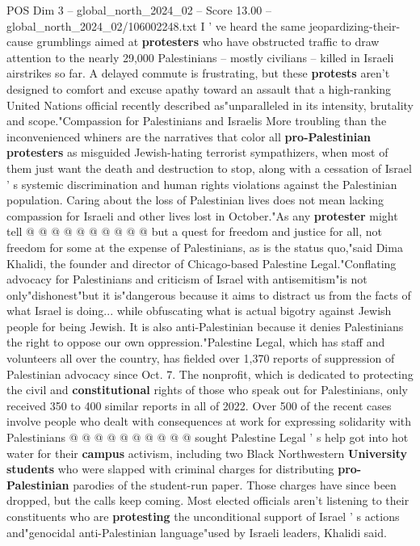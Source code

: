 \begin{textsample}{POS Dim 3 – global\_north\_2024\_02 – Score 13.00 – global\_north\_2024\_02/106002248.txt}
I ' ve heard the same jeopardizing-their-cause grumblings aimed at \textbf{protesters} who have obstructed traffic to draw attention to the nearly 29,000 Palestinians -- mostly civilians -- killed in Israeli airstrikes so far.
A delayed commute is frustrating, but these \textbf{protests} aren't designed to comfort and excuse apathy toward an assault that a high-ranking United Nations official recently described as"unparalleled in its intensity, brutality and scope."Compassion for Palestinians and Israelis More troubling than the inconvenienced whiners are the narratives that color all \textbf{pro-Palestinian} \textbf{protesters} as misguided Jewish-hating terrorist sympathizers, when most of them just want the death and destruction to stop, along with a cessation of Israel ' s systemic discrimination and human rights violations against the Palestinian population.
Caring about the loss of Palestinian lives does not mean lacking compassion for Israeli and other lives lost in October."As any \textbf{protester} might tell @ @ @ @ @ @ @ @ @ @ but a quest for freedom and justice for all, not freedom for some at the expense of Palestinians, as is the status quo,"said Dima Khalidi, the founder and director of Chicago-based Palestine Legal."Conflating advocacy for Palestinians and criticism of Israel with antisemitism"is not only"dishonest"but it is"dangerous because it aims to distract us from the facts of what Israel is doing... while obfuscating what is actual bigotry against Jewish people for being Jewish.
It is also anti-Palestinian because it denies Palestinians the right to oppose our own oppression."Palestine Legal, which has staff and volunteers all over the country, has fielded over 1,370 reports of suppression of Palestinian advocacy since Oct. 7.
The nonprofit, which is dedicated to protecting the civil and \textbf{constitutional} rights of those who speak out for Palestinians, only received 350 to 400 similar reports in all of 2022.
Over 500 of the recent cases involve people who dealt with consequences at work for expressing solidarity with Palestinians @ @ @ @ @ @ @ @ @ @ sought Palestine Legal ' s help got into hot water for their \textbf{campus} activism, including two Black Northwestern \textbf{University} \textbf{students} who were slapped with criminal charges for distributing \textbf{pro-Palestinian} parodies of the student-run paper.
Those charges have since been dropped, but the calls keep coming.
Most elected officials aren't listening to their constituents who are \textbf{protesting} the unconditional support of Israel ' s actions and"genocidal anti-Palestinian language"used by Israeli leaders, Khalidi said.

\end{textsample}
